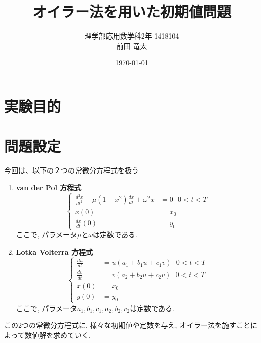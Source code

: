 \documentclass[12pt,a4paper]{jsarticle}
\begin{document}
\begin{titlepage}
\title{オイラー法を用いた初期値問題}
\author{理学部応用数学科2年 $$1418104 \\前田 竜太}
\date{\today}
\maketitle
\thispagestyle{empty}
\end{titlepage}

\section{実験目的}

\section{問題設定}
今回は、以下の２つの常微分方程式を扱う
\begin{enumerate}
	\item \textbf{van der Pol 方程式}
		\begin{equation*}
		\left\{
		\begin{aligned}
		\frac{d^{2} x}{dt^{2}} - \mu(1 - x^{2})\frac{dx}{dt} + \omega^{2} x &= 0 ~~~ 0 < t < T\\
		x(0) &= x_0 \\
		\frac{dx}{dt}(0) &= y_0
		\end{aligned}
		\right.
		\end{equation*}
		ここで, パラメータ$\mu$と$\omega$は定数である.
	\item \textbf{Lotka Volterra 方程式}
		\begin{equation*}
		\left\{
		\begin{aligned}
		\frac{du}{dt} &= u(a_1 + b_1u + c_1v) ~~~ 0 < t < T \\
		\frac{dv}{dt} &= v(a_2 + b_2u + c_2v) ~~~ 0 < t < T \\
		x(0) &= x_0 \\ 
		y(0) &= y_0
		\end{aligned}
		\right.
		\end{equation*}
		ここで, パラメータ$a_1, b_1, c_1, a_2, b_2, c_2$は定数である. 
\end{enumerate}
この2つの常微分方程式に, 様々な初期値や定数を与え, オイラー法を施すことによって数値解を求めていく.
\end{document}
